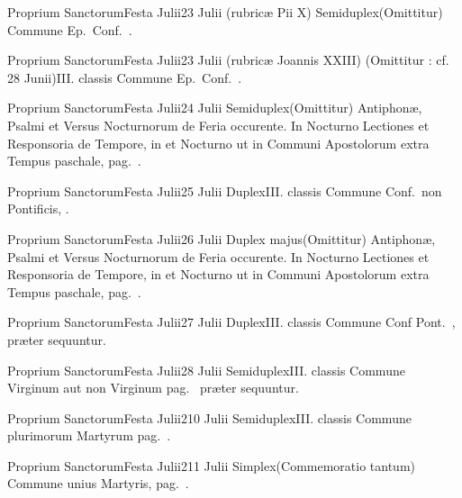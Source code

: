 \documentclass[nocturnale-romanum.tex]{subfiles}
\begin{document}
	{Proprium Sanctorum}{Festa Julii}{2}{3 Julii (rubricæ Pii X)}
	{Semiduplex}{(Omittitur)}
	{Commune Ep.\ Conf.\ \pageref{M-COPO}.}
	{}

	{Proprium Sanctorum}{Festa Julii}{2}{3 Julii (rubricæ Joannis XXIII)}
	{(Omittitur : cf. 28 Junii)}{III. classis}
	{}
	{Commune Ep.\ Conf.\ \pageref{M-COPO}.}

	{Proprium Sanctorum}{Festa Julii}{2}{4 Julii}
	{Semiduplex}{(Omittitur)}
	{Antiphonæ, Psalmi et Versus Nocturnorum de Feria occurente. In  Nocturno Lectiones et Responsoria de Tempore, in  et  Nocturno ut in Communi Apostolorum extra Tempus paschale, pag.\ \pageref{M-APEXN2R1}.}
	{}

	{Proprium Sanctorum}{Festa Julii}{2}{5 Julii}
	{Duplex}{III. classis}
	{Commune Conf.\ non Pontificis, \pageref{M-CONP}.}
	{}

	{Proprium Sanctorum}{Festa Julii}{2}{6 Julii}
	{Duplex majus}{(Omittitur)}
	{Antiphonæ, Psalmi et Versus Nocturnorum de Feria occurente. In  Nocturno Lectiones et Responsoria de Tempore, in  et  Nocturno ut in Communi Apostolorum extra Tempus paschale, pag.\ \pageref{M-APEXN2R1}.}
	{}

	{Proprium Sanctorum}{Festa Julii}{2}{7 Julii}
	{Duplex}{III. classis}
	{Commune Conf Pont.\ \pageref{M-COPO}, præter sequuntur.}
	{}

	{Proprium Sanctorum}{Festa Julii}{2}{8 Julii}
	{Semiduplex}{III. classis}
	{Commune Virginum aut non Virginum pag.\ \pageref{M-MU} præter sequuntur.}
	{}

	{Proprium Sanctorum}{Festa Julii}{2}{10 Julii}
	{Semiduplex}{III. classis}
	{Commune plurimorum Martyrum pag.\ \pageref{M-PMEX}.}
	{}

	{Proprium Sanctorum}{Festa Julii}{2}{11 Julii}
	{Simplex}{(Commemoratio tantum)}
	{Commune unius Martyris, pag.\ \pageref{M-UMEX}.}
	{}
\end{document}
